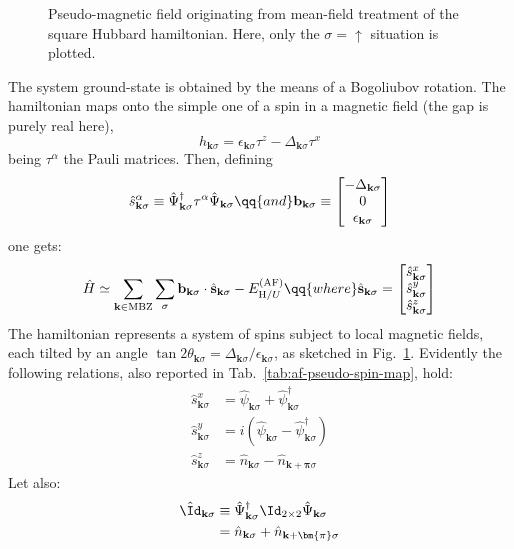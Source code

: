 \begin{figure}
	\centering
	 
	\caption{Pseudo-magnetic field originating from mean-field treatment of the square Hubbard hamiltonian. Here, only the $\sigma=\uparrow$ situation is plotted.}
	\label{appfig:pseudo-magnetic-field}
\end{figure}

The system ground-state is obtained by the means of a Bogoliubov rotation. The hamiltonian maps onto the simple one of a spin in a magnetic field (the gap is purely real here),
\[
	h_{\mathbf{k}\sigma} = \epsilon_{\mathbf{k}\sigma} \tau^z - \Delta_{\mathbf{k}\sigma} \tau^x
\]
being $\tau^\alpha$ the Pauli matrices. Then, defining
\[
	\hat s_{\mathbf{k}\sigma}^\alpha \equiv \hat \Psi_{\mathbf{k}\sigma}^\dagger \tau^\alpha \hat \Psi_{\mathbf{k}\sigma}
	\qq{and}
	\mathbf{b}_{\mathbf{k}\sigma} \equiv \begin{bmatrix}
		-\Delta_{\mathbf{k}\sigma} \\ 0 \\ \epsilon_{\mathbf{k}\sigma} 
	\end{bmatrix}
\]
one gets:
\begin{equation}\label{af-hm-spin-h}
	\hat H \simeq \sum_{\mathbf{k} \in \mathrm{MBZ}} \sum_\sigma \mathbf{b}_{\mathbf{k}\sigma} \cdot \hat{\mathbf{s}}_{\mathbf{k}\sigma} - E_{\mathrm{H}/U}^{(\mathrm{AF})}
	\qq{where}
	\hat{\mathbf{s}}_{\mathbf{k}\sigma} = \begin{bmatrix}
		\hat s_{\mathbf{k}\sigma}^x \\
		\hat s_{\mathbf{k}\sigma}^y \\
		\hat s_{\mathbf{k}\sigma}^z
	\end{bmatrix}
\end{equation}
The hamiltonian represents a system of spins subject to local magnetic fields, each tilted by an angle $\tan 2\theta_{\mathbf{k}\sigma} = \Delta_{\mathbf{k}\sigma}/\epsilon_{\mathbf{k}\sigma}$, as sketched in Fig.~\ref{appfig:pseudo-magnetic-field}. Evidently the following relations, also reported in Tab.~\ref{tab:af-pseudo-spin-map}, hold:
\begin{align}
	\hat s_{\mathbf{k}\sigma}^x &= \hat \psi_{\mathbf{k}\sigma} + \hat \psi_{\mathbf{k}\sigma}^\dagger \label{appeq:af-hm-x-psi} \\
	\hat s_{\mathbf{k}\sigma}^y &= i \left(
		\hat \psi_{\mathbf{k}\sigma} - \hat \psi_{\mathbf{k}\sigma}^\dagger 
	\right) \label{appeq:af-hm-y-psi} \\
	\hat s_{\mathbf{k}\sigma}^z &= \hat n_{\mathbf{k}\sigma} - \hat n_{\mathbf{k}+\bm{\pi}\sigma} \label{appeq:af-hm-z-psi} 
\end{align}
Let also:
\begin{align}
	\hat \Id_{\mathbf{k}\sigma} &\equiv \hat \Psi_{\mathbf{k}\sigma}^\dagger \Id_{2\times2} \hat \Psi_{\mathbf{k}\sigma} \nonumber \\
	&= \hat n_{\mathbf{k}\sigma} + \hat n_{\mathbf{k}+\bm{\pi}\sigma} \label{appeq:af-hm-id-def}
\end{align}

